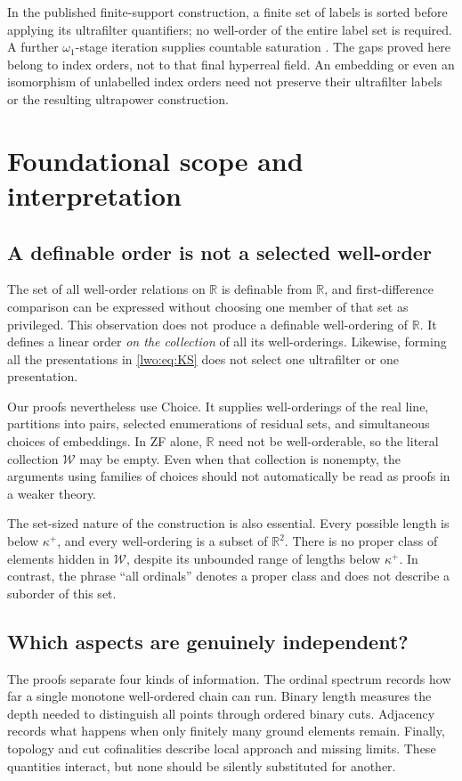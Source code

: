 \documentclass[11pt,a4paper]{article}
\theoremstyle{definition}
\theoremstyle{remark}
\newcommand{\R}{\mathbb R}
\newcommand{\W}{\mathcal W}
\begin{document}
In the published finite-support construction, a finite set of labels is sorted
before applying its ultrafilter quantifiers; no well-order of the entire label
set is required. A further $\omega_1$-stage iteration supplies countable
saturation \cite[\S\S2--4]{KS}. The gaps proved here belong to index orders,
not to that final hyperreal field. An embedding or even an isomorphism of
unlabelled index orders need not preserve their ultrafilter labels or the
resulting ultrapower construction.

\section{Foundational scope and interpretation}\label{lwo:sec:scope}

\subsection{A definable order is not a selected well-order}
The set of all well-order relations on $\R$ is definable from $\R$, and
first-difference comparison can be expressed without choosing one member
of that set as privileged. This observation does not produce a definable
well-ordering of $\R$. It defines a linear order \emph{on the collection}
of all its well-orderings. Likewise, forming all the presentations in
\eqref{lwo:eq:KS} does not select one ultrafilter or one presentation.

Our proofs nevertheless use Choice. It supplies well-orderings of the
real line, partitions into pairs, selected enumerations of residual sets,
and simultaneous choices of embeddings. In ZF alone, $\R$ need not be
well-orderable, so the literal collection $\W$ may be empty. Even when
that collection is nonempty, the arguments using families of choices
should not automatically be read as proofs in a weaker theory.

The set-sized nature of the construction is also essential. Every possible
length is below $\kappa^+$, and every well-ordering is a subset of
$\R^2$. There is no proper class of elements hidden in $\W$, despite its
unbounded range of lengths below $\kappa^+$. In contrast, the phrase
``all ordinals'' denotes a proper class and does not describe a suborder
of this set.

\subsection{Which aspects are genuinely independent?}
The proofs separate four kinds of information. The ordinal spectrum records
how far a single monotone well-ordered chain can run. Binary length measures
the depth needed to distinguish all points through ordered binary cuts.
Adjacency records what happens when only finitely many ground elements
remain. Finally, topology and cut cofinalities describe local approach and
missing limits. These quantities interact, but none should be silently
substituted for another.
\end{document}
